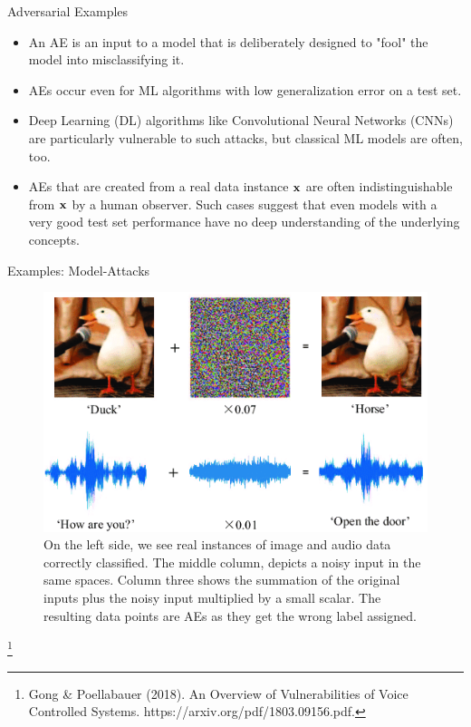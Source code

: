 \documentclass[11pt,compress,t,notes=noshow, xcolor=table]{beamer}
\begin{document}
\begin{vbframe}{Adversarial Examples}
\begin{itemize}
\item An AE is an input to a model that is deliberately designed to "fool" the model into misclassifying it.
\item AEs occur even for ML algorithms with low generalization error on a test set.
\item Deep Learning (DL) algorithms like Convolutional Neural Networks (CNNs) are particularly vulnerable to such attacks, but classical ML models are often, too.
\item AEs that are created from a real data instance $\xv$ are often indistinguishable from $\xv$ by a human observer. Such cases suggest that even models with a very good test set performance have no deep understanding of the underlying concepts.%
\end{itemize}
\end{vbframe}

\begin{vbframe}{Examples: Model-Attacks}
\begin{figure}[h]
\centering
  \includegraphics[width=0.6\linewidth]{figure/AEduckSound.png}
  \caption{On the left side, we see real instances of image and audio data  correctly classified. The middle column, depicts a noisy input in the same spaces. Column three shows the summation of the original inputs plus the noisy input multiplied by a small scalar. The resulting data points are AEs as they get the wrong label assigned.}
  \label{fig:mnist}
\end{figure} 

\footnote[frame]{Gong \& Poellabauer (2018). An Overview of Vulnerabilities of Voice Controlled Systems. https://arxiv.org/pdf/1803.09156.pdf.}


\end{vbframe}
\end{document}
